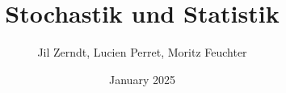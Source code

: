\documentclass[a4paper, fontsize = 8pt, landscape]{scrartcl}
\title{Stochastik und Statistik}
\author{Jil Zerndt, Lucien Perret, Moritz Feuchter}
\date{January 2025}
\begin{document}
\begin{multicols}{3}
	\thispagestyle{TitlePageStyle}
	\maketitle
	\sffamily
	
	\raggedcolumns
    
    \raggedcolumns
	
	\raggedcolumns
	
	\raggedcolumns
	
	\raggedcolumns
	
	\raggedcolumns
	
	\raggedcolumns

%    
\end{multicols} 
\end{document}
